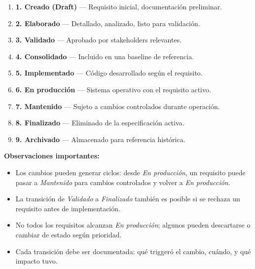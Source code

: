 \begin{enumerate}[leftmargin=1.5em, labelindent=0pt]
  \item[] \phantom{0} \textbf{1. Creado (Draft)} — Requisito inicial, documentaci\'on preliminar.
  \item[] \phantom{0} \textbf{2. Elaborado} — Detallado, analizado, listo para validaci\'on.
  \item[] \phantom{0} \textbf{3. Validado} — Aprobado por stakeholders relevantes.
  \item[] \phantom{0} \textbf{4. Consolidado} — Incluido en una baseline de referencia.
  \item[] \phantom{0} \textbf{5. Implementado} — C\'odigo desarrollado seg\'un el requisito.
  \item[] \phantom{0} \textbf{6. En producci\'on} — Sistema operativo con el requisito activo.
  \item[] \phantom{0} \textbf{7. Mantenido} — Sujeto a cambios controlados durante operaci\'on.
  \item[] \phantom{0} \textbf{8. Finalizado} — Eliminado de la especificaci\'on activa.
  \item[] \phantom{0} \textbf{9. Archivado} — Almacenado para referencia hist\'orica.
\end{enumerate}

\textbf{Observaciones importantes:}
\begin{itemize}[leftmargin=1.2em]
  \item Los cambios pueden generar ciclos: desde \emph{En producci\'on}, un requisito puede pasar a \emph{Mantenido} para cambios controlados y volver a \emph{En producci\'on}.
  \item La transici\'on de \emph{Validado} a \emph{Finalizado} también es posible si se rechaza un requisito antes de implementaci\'on.
  \item No todos los requisitos alcanzan \emph{En producci\'on}; algunos pueden descartarse o cambiar de estado seg\'un prioridad.
  \item Cada transici\'on debe ser documentada: qu\'e triggeró el cambio, cu\'ando, y qu\'e impacto tuvo.
\end{itemize}
